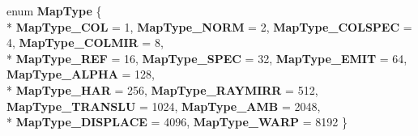 \begin{DoxyCompactItemize}
\item 
\hypertarget{struct_assimp_1_1_blender_1_1_m_tex_abbd69f65fd0876024dd17551e739895f}{enum {\bfseries Map\+Type} \{ \\*
{\bfseries Map\+Type\+\_\+\+C\+O\+L} = 1, 
{\bfseries Map\+Type\+\_\+\+N\+O\+R\+M} = 2, 
{\bfseries Map\+Type\+\_\+\+C\+O\+L\+S\+P\+E\+C} = 4, 
{\bfseries Map\+Type\+\_\+\+C\+O\+L\+M\+I\+R} = 8, 
\\*
{\bfseries Map\+Type\+\_\+\+R\+E\+F} = 16, 
{\bfseries Map\+Type\+\_\+\+S\+P\+E\+C} = 32, 
{\bfseries Map\+Type\+\_\+\+E\+M\+I\+T} = 64, 
{\bfseries Map\+Type\+\_\+\+A\+L\+P\+H\+A} = 128, 
\\*
{\bfseries Map\+Type\+\_\+\+H\+A\+R} = 256, 
{\bfseries Map\+Type\+\_\+\+R\+A\+Y\+M\+I\+R\+R} = 512, 
{\bfseries Map\+Type\+\_\+\+T\+R\+A\+N\+S\+L\+U} = 1024, 
{\bfseries Map\+Type\+\_\+\+A\+M\+B} = 2048, 
\\*
{\bfseries Map\+Type\+\_\+\+D\+I\+S\+P\+L\+A\+C\+E} = 4096, 
{\bfseries Map\+Type\+\_\+\+W\+A\+R\+P} = 8192
 \}}\label{struct_assimp_1_1_blender_1_1_m_tex_abbd69f65fd0876024dd17551e739895f}

\end{DoxyCompactItemize}
